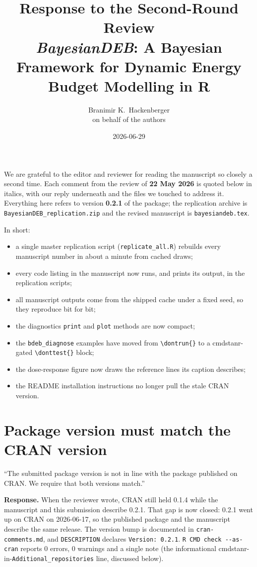 \documentclass[11pt,a4paper]{article}
\title{Response to the Second-Round Review\\
\large \textit{BayesianDEB}: A Bayesian Framework for Dynamic Energy
Budget Modelling in R}
\author{Branimir K.\ Hackenberger\\ \small on behalf of the authors}
\date{2026-06-29}
\newcommand{\code}[1]{\texttt{#1}}
\newcommand{\pkg}[1]{\textsf{#1}}
\begin{document}
\maketitle

We are grateful to the editor and reviewer for reading the manuscript so
closely a second time. Each comment from the review of \textbf{22 May
2026} is quoted below in italics, with our reply underneath and the files
we touched to address it. Everything here refers to version
\textbf{0.2.1} of the package; the replication archive is
\code{BayesianDEB\_replication.zip} and the revised manuscript is
\code{bayesiandeb.tex}.

In short:
\begin{itemize}[nosep]
\item a single master replication script (\code{replicate\_all.R})
  rebuilds every manuscript number in about a minute from cached draws;
\item every code listing in the manuscript now runs, and prints its
  output, in the replication scripts;
\item all manuscript outputs come from the shipped cache under a fixed
  seed, so they reproduce bit for bit;
\item the diagnostics \code{print} and \code{plot} methods are now
  compact;
\item the \code{bdeb\_diagnose} examples have moved from
  \code{\textbackslash dontrun\{\}} to a \pkg{cmdstanr}-gated
  \code{\textbackslash donttest\{\}} block;
\item the dose-response figure now draws the reference lines its caption
  describes;
\item the README installation instructions no longer pull the stale CRAN
  version.
\end{itemize}

\section{Package version must match the CRAN version}

\begin{displayquote}
``The submitted package version is not in line with the package
published on CRAN. We require that both versions match.''
\end{displayquote}

\textbf{Response.} When the reviewer wrote, CRAN still held 0.1.4 while
the manuscript and this submission describe 0.2.1. That gap is now
closed: 0.2.1 went up on CRAN on 2026-06-17, so the published package and
the manuscript describe the same release. The version bump is documented
in \code{cran-comments.md}, and \code{DESCRIPTION} declares
\code{Version: 0.2.1}. \verb|R CMD check --as-cran| reports 0 errors,
0 warnings and a single note (the informational
\pkg{cmdstanr}-in-\code{Additional\_repositories} line, discussed below).
\end{document}
